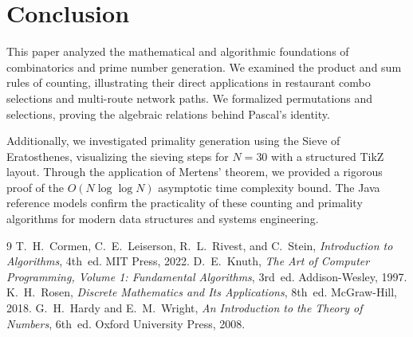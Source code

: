 \documentclass[10pt,journal,compsoc,onecolumn]{IEEEtran}
\begin{document}
\section{Conclusion}
\label{sec:conclusion}

This paper analyzed the mathematical and algorithmic foundations of combinatorics and prime number generation. We examined the product and sum rules of counting, illustrating their direct applications in restaurant combo selections and multi-route network paths. We formalized permutations and selections, proving the algebraic relations behind Pascal's identity. 

Additionally, we investigated primality generation using the Sieve of Eratosthenes, visualizing the sieving steps for $N=30$ with a structured TikZ layout. Through the application of Mertens' theorem, we provided a rigorous proof of the $O(N \log \log N)$ asymptotic time complexity bound. The Java reference models confirm the practicality of these counting and primality algorithms for modern data structures and systems engineering.

\begin{thebibliography}{9}
 T.~H.~Cormen, C.~E.~Leiserson, R.~L.~Rivest, and C.~Stein, \emph{Introduction to Algorithms}, 4th~ed. MIT Press, 2022.
 D.~E.~Knuth, \emph{The Art of Computer Programming, Volume 1: Fundamental Algorithms}, 3rd~ed. Addison-Wesley, 1997.
 K.~H.~Rosen, \emph{Discrete Mathematics and Its Applications}, 8th~ed. McGraw-Hill, 2018.
 G.~H.~Hardy and E.~M.~Wright, \emph{An Introduction to the Theory of Numbers}, 6th~ed. Oxford University Press, 2008.
\end{thebibliography}
\end{document}
